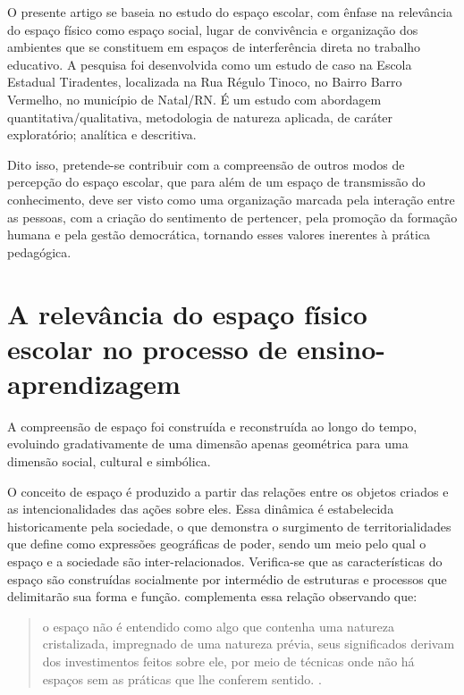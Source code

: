 \begin{refsection}
    O presente artigo se baseia no estudo do espaço escolar, com ênfase na relevância do espaço físico como espaço social, lugar de convivência e organização dos ambientes que se constituem em espaços de interferência direta no trabalho educativo. A pesquisa foi desenvolvida como um estudo de caso na Escola Estadual Tiradentes, localizada na Rua Régulo Tinoco, no Bairro Barro Vermelho, no município de Natal/RN. É um estudo com abordagem quantitativa/qualitativa, metodologia de natureza aplicada, de caráter exploratório; analítica e descritiva. 

    Dito isso, pretende-se contribuir com a compreensão de outros modos de percepção do espaço escolar, que para além de um espaço de transmissão do conhecimento, deve ser visto como uma organização marcada pela interação entre as pessoas, com a criação do sentimento de pertencer, pela promoção da formação humana e pela gestão democrática, tornando esses valores inerentes à prática pedagógica.  


    \section{A relevância do espaço físico escolar no processo de ensino-aprendizagem}

    A compreensão de espaço foi construída e reconstruída ao longo do tempo, evoluindo gradativamente de uma dimensão apenas geométrica para uma dimensão social, cultural e simbólica. 

    O conceito de espaço é produzido a partir das relações entre os objetos criados e as intencionalidades das ações sobre eles. Essa dinâmica é estabelecida historicamente pela sociedade, o que demonstra o surgimento de territorialidades que \textcite{SACK1986Human} define como expressões geográficas de poder, sendo um meio pelo qual o espaço e a sociedade são inter-relacionados. Verifica-se que as características do espaço são construídas socialmente por intermédio de estruturas e processos que delimitarão sua forma e função. \textcite{HORANETO2015Dinâmica} complementa essa relação observando que: 

    \begin{quotation}
        o espaço não é entendido como algo que contenha uma natureza cristalizada, impregnado de uma natureza prévia, seus significados derivam dos investimentos feitos sobre ele, por meio de técnicas onde não há espaços sem as práticas que lhe conferem sentido. \cite[p.~22]{HORANETO2015Dinâmica}. 
    \end{quotation}


\end{refsection}
